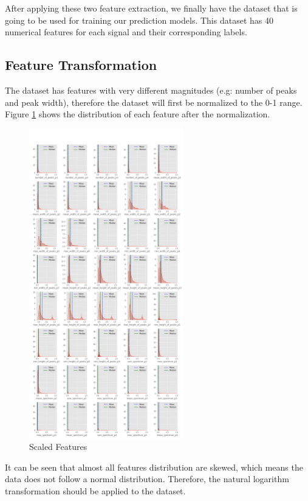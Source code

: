 \documentclass[11pt]{article}
\begin{document}
After applying these two feature extraction, we finally have the dataset
that is going to be used for training our prediction models. This
dataset has 40 numerical features for each signal and their
corresponding labels.

\hypertarget{feature-transformation}{%
\subsection{Feature Transformation}\label{feature-transformation}}

The dataset has features with very different magnitudes (e.g: number of
peaks and peak width), therefore the dataset will first be normalized to
the 0-1 range. Figure \ref{fig:pdsignal_scaledfeat} shows the distribution of each feature
after the normalization.


\begin{figure}[h]
\centering
\includegraphics[width=0.6\textwidth]{dist_minmax_scaled.png}
\caption{Scaled Features}
\label{fig:pdsignal_scaledfeat}
\end{figure}


It can be seen that almost all features distribution are skewed, which
means the data does not follow a normal distribution. Therefore, the
natural logarithm transformation should be applied to the dataset.
\end{document}
